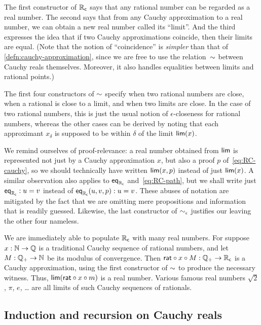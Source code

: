 \mentalpause

The first constructor of $\mathbb{R}_\mathsf{c}$ says that any rational number can be regarded as a real number.
The second says that from any Cauchy approximation to a real number, we can obtain a new real number called its ``limit''.
And the third expresses the idea that if two Cauchy approximations coincide, then their limits are equal.
(Note that the notion of ``coincidence''
%
is \emph{simpler} than that of \autoref{defn:cauchy-approximation}, since we are free to use the relation~$\mathord\sim$ between Cauchy reals themselves.
Moreover, it also handles equalities between limits and rational points.)

The first four constructors of $\mathord\sim$ specify when two rational numbers are close, when a rational is close to a limit, and when two limits are close.
In the case of two rational numbers, this is just the usual notion of $\epsilon$-closeness for rational numbers, whereas the other cases can be derived by noting that each approximant $x_\delta$ is supposed to be within $\delta$ of the limit $\mathsf{lim}(x)$.

We remind ourselves of proof-relevance: a real number obtained from $\mathsf{lim}$ is represented not
just by a Cauchy approximation $x$, but also a proof $p$ of~\eqref{eq:RC-cauchy}, so we
should technically have written $\mathsf{lim}(x,p)$ instead of just $\mathsf{lim}(x)$.
A similar observation also applies to $\mathsf{eq}_{\mathbb{R}_\mathsf{c}}$ and~\eqref{eq:RC-path}, but we shall write just
$\mathsf{eq}_{\mathbb{R}_\mathsf{c}} : u = v$ instead of $\mathsf{eq}_{\mathbb{R}_\mathsf{c}}(u, v, p) : u = v$. These abuses of notation are
mitigated by the fact that we are omitting mere propositions and information that is
readily guessed.
Likewise, the last constructor of $\mathord{\sim_{\epsilon}}$ justifies our leaving the other four nameless.

We are immediately able to populate $\mathbb{R}_\mathsf{c}$ with many real numbers. For suppose $x : \mathbb{N} \to
\mathbb{Q}$ is a traditional Cauchy sequence of rational numbers, and let $M : \mathbb{Q}_{+} \to \mathbb{N}$ be its
modulus of convergence. Then $\mathsf{rat} \circ x \circ M : \mathbb{Q}_{+} \to \mathbb{R}_\mathsf{c}$ is a Cauchy
approximation, using the first constructor of $\mathord\sim$ to produce the necessary witness.
Thus, $\mathsf{lim}(\mathsf{rat} \circ x \circ m)$ is a real number. Various famous
real numbers $\sqrt{2}$, $\pi$, $e$, \dots{} are all limits of such Cauchy sequences of
rationals.

\subsection{Induction and recursion on Cauchy reals}
\label{sec:induct-recurs-cauchy}

